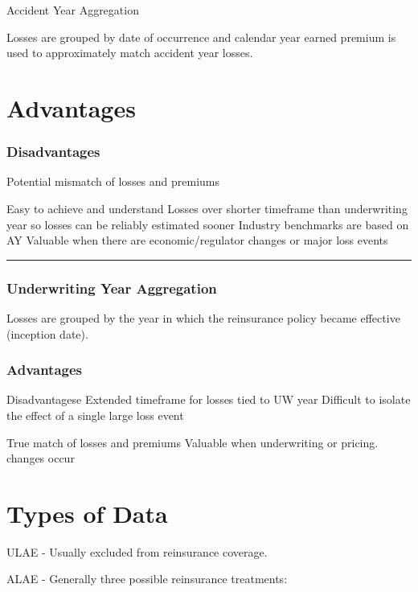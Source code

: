 \documentclass[
]{article}
\begin{document}
Accident Year Aggregation

Losses are grouped by date of occurrence and calendar year earned
premium is used to approximately match accident year losses.

\section{Advantages}\label{advantages}

\subsubsection{Disadvantages}\label{disadvantages}

Potential mismatch of losses and premiums

Easy to achieve and understand Losses over shorter timeframe than
underwriting year so losses can be reliably estimated sooner Industry
benchmarks are based on AY Valuable when there are economic/regulator
changes or major loss events

\begin{center}\rule{0.5\linewidth}{0.5pt}\end{center}

\subsubsection{Underwriting Year
Aggregation}\label{underwriting-year-aggregation}

Losses are grouped by the year in which the reinsurance policy became
effective (inception date).

\subsubsection{Advantages}\label{advantages-1}

Disadvantagese Extended timeframe for losses tied to UW year Difficult
to isolate the effect of a single large loss event

True match of losses and premiums Valuable when underwriting or pricing.
changes occur

\section{Types of Data}\label{types-of-data}

ULAE - Usually excluded from reinsurance coverage.

ALAE - Generally three possible reinsurance treatments:
\end{document}

